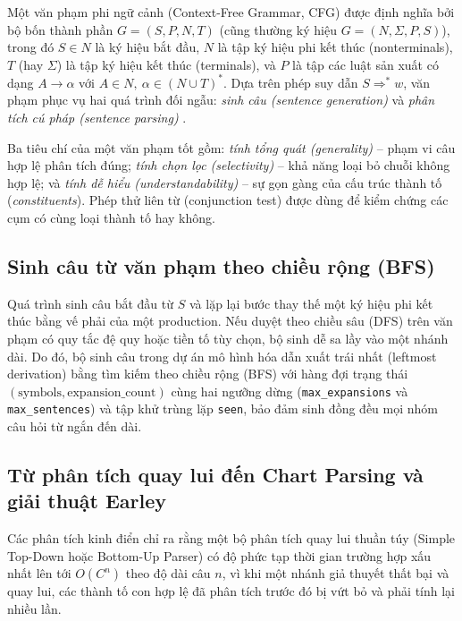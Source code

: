 Một văn phạm phi ngữ cảnh (Context-Free Grammar, CFG) được định nghĩa bởi bộ bốn thành phần $G=(S,P,N,T)$ (cũng thường ký hiệu $G=(N,\Sigma,P,S)$), trong đó $S\in N$ là ký hiệu bắt đầu, $N$ là tập ký hiệu phi kết thúc (nonterminals), $T$ (hay $\Sigma$) là tập ký hiệu kết thúc (terminals), và $P$ là tập các luật sản xuất có dạng $A\rightarrow\alpha$ với $A\in N,\ \alpha\in (N\cup T)^*$. Dựa trên phép suy dẫn $S\Rightarrow^* w$, văn phạm phục vụ hai quá trình đối ngẫu: \emph{sinh câu (sentence generation)} và \emph{phân tích cú pháp (sentence parsing)} \cite{jurafsky-martin}.

Ba tiêu chí của một văn phạm tốt gồm: \emph{tính tổng quát (generality)} -- phạm vi câu hợp lệ phân tích đúng; \emph{tính chọn lọc (selectivity)} -- khả năng loại bỏ chuỗi không hợp lệ; và \emph{tính dễ hiểu (understandability)} -- sự gọn gàng của cấu trúc thành tố (\emph{constituents}). Phép thử liên từ (conjunction test) được dùng để kiểm chứng các cụm có cùng loại thành tố hay không.

\subsection{Sinh câu từ văn phạm theo chiều rộng (BFS)}

Quá trình sinh câu bắt đầu từ $S$ và lặp lại bước thay thế một ký hiệu phi kết thúc bằng vế phải của một production. Nếu duyệt theo chiều sâu (DFS) trên văn phạm có quy tắc đệ quy hoặc tiền tố tùy chọn, bộ sinh dễ sa lầy vào một nhánh dài. Do đó, bộ sinh câu trong dự án mô hình hóa dẫn xuất trái nhất (leftmost derivation) bằng tìm kiếm theo chiều rộng (BFS) với hàng đợi trạng thái $(\text{symbols}, \text{expansion\_count})$ cùng hai ngưỡng dừng (\texttt{max\_expansions} và \texttt{max\_sentences}) và tập khử trùng lặp \texttt{seen}, bảo đảm sinh đồng đều mọi nhóm câu hỏi từ ngắn đến dài.

\subsection{Từ phân tích quay lui đến Chart Parsing và giải thuật Earley}

Các phân tích kinh điển chỉ ra rằng một bộ phân tích quay lui thuần túy (Simple Top-Down hoặc Bottom-Up Parser) có độ phức tạp thời gian trường hợp xấu nhất lên tới $O(C^n)$ theo độ dài câu $n$, vì khi một nhánh giả thuyết thất bại và quay lui, các thành tố con hợp lệ đã phân tích trước đó bị vứt bỏ và phải tính lại nhiều lần.

